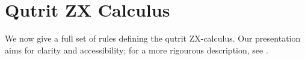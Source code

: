 
\section{Qutrit ZX Calculus}


We now give a full set of rules defining the qutrit ZX-calculus. Our presentation aims for clarity and accessibility; for a more rigourous description, see \cite{harny_completeness}.

